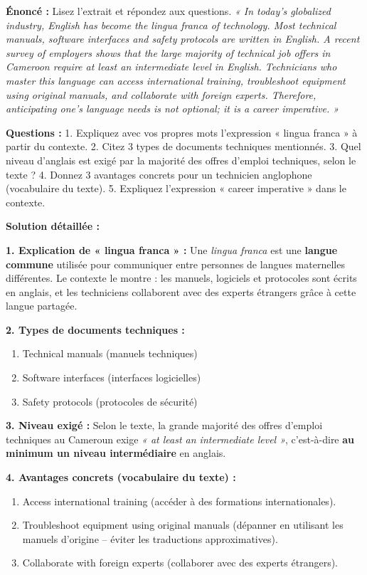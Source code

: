 \documentclass[11pt]{article}
\newcommand{\cle}[1]{{\popxbold\color{popdark}#1}}
\begin{document}
\begin{exoresolu}
\textbf{Énoncé :} Lisez l'extrait et répondez aux questions.
\textit{« In today's globalized industry, English has become the \cle{lingua franca} of technology. Most \cle{technical manuals}, \cle{software interfaces} and \cle{safety protocols} are written in English. A recent survey of employers shows that the large majority of technical job offers in Cameroon require at least an \cle{intermediate level} in English. Technicians who \cle{master} this language can \cle{access} international training, \cle{troubleshoot} equipment using original manuals, and \cle{collaborate} with foreign experts. Therefore, anticipating one's language needs is not optional; it is a \cle{career imperative}. »}

\textbf{Questions :}
1. Expliquez avec vos propres mots l'expression « \cle{lingua franca} » à partir du contexte.
2. Citez 3 types de documents techniques mentionnés.
3. Quel niveau d'anglais est exigé par la majorité des offres d'emploi techniques, selon le texte ?
4. Donnez 3 avantages concrets pour un technicien anglophone (vocabulaire du texte).
5. Expliquez l'expression « \cle{career imperative} » dans le contexte.

\tcblower
\textbf{Solution détaillée :}

\textbf{1. Explication de « lingua franca » :}
Une \emph{lingua franca} est une \textbf{langue commune} utilisée pour communiquer entre personnes de langues maternelles différentes. Le contexte le montre : les manuels, logiciels et protocoles sont écrits en anglais, et les techniciens collaborent avec des experts étrangers grâce à cette langue partagée.

\textbf{2. Types de documents techniques :}
\begin{enumerate}
    \item \cle{Technical manuals} (manuels techniques)
    \item \cle{Software interfaces} (interfaces logicielles)
    \item \cle{Safety protocols} (protocoles de sécurité)
\end{enumerate}

\textbf{3. Niveau exigé :}
Selon le texte, la grande majorité des offres d'emploi techniques au Cameroun exige \emph{« at least an intermediate level »}, c'est-à-dire \textbf{au minimum un niveau intermédiaire} en anglais.

\textbf{4. Avantages concrets (vocabulaire du texte) :}
\begin{enumerate}
    \item \cle{Access international training} (accéder à des formations internationales).
    \item \cle{Troubleshoot equipment using original manuals} (dépanner en utilisant les manuels d'origine -- éviter les traductions approximatives).
    \item \cle{Collaborate with foreign experts} (collaborer avec des experts étrangers).
\end{enumerate}


\end{exoresolu}
\end{document}
